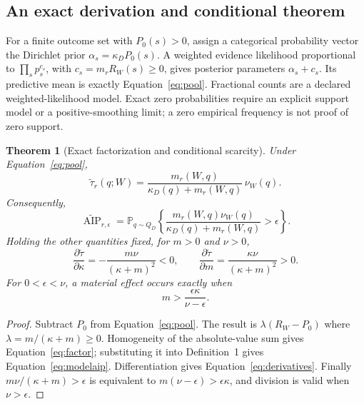 \documentclass[11pt,letterpaper]{article}
\newtheorem{theorem}{Theorem}
\theoremstyle{definition}\newtheorem{definition}[theorem]{Definition}
\newcommand{\AIP}{\operatorname{AIP}}
\newcommand{\Prob}{\mathbb{P}}
\begin{document}
\subsection{An exact derivation and conditional theorem}
For a finite outcome set with $P_0(s)>0$, assign a categorical probability vector the Dirichlet prior $\alpha_s=\kappa_D P_0(s)$. A weighted evidence likelihood proportional to $\prod_s p_s^{c_s}$, with $c_s=m_rR_W(s)\ge0$, gives posterior parameters $\alpha_s+c_s$. Its predictive mean is exactly Equation~\eqref{eq:pool}. Fractional counts are a declared weighted-likelihood model. Exact zero probabilities require an explicit support model or a positive-smoothing limit; a zero empirical frequency is not proof of zero support.

\begin{theorem}[Exact factorization and conditional scarcity]
Under Equation~\eqref{eq:pool},
\begin{equation}
\boxed{\widetilde\tau_r(q;W)
=\frac{m_r(W,q)}{\kappa_D(q)+m_r(W,q)}\,\nu_W(q).}
\label{eq:factor}
\end{equation}
Consequently,
\begin{equation}
\boxed{\widetilde{\AIP}_{r,\epsilon}
=\Prob_{q\sim Q_D}\left\{
\frac{m_r(W,q)\nu_W(q)}{\kappa_D(q)+m_r(W,q)}>\epsilon\right\}.}
\label{eq:modelaip}
\end{equation}
Holding the other quantities fixed, for $m>0$ and $\nu>0$,
\begin{equation}
\frac{\partial\widetilde\tau}{\partial\kappa}
=-\frac{m\nu}{(\kappa+m)^2}<0,
\qquad
\frac{\partial\widetilde\tau}{\partial m}
=\frac{\kappa\nu}{(\kappa+m)^2}>0.
\label{eq:derivatives}
\end{equation}
For $0<\epsilon<\nu$, a material effect occurs exactly when
\begin{equation}
\boxed{m>\frac{\epsilon\kappa}{\nu-\epsilon}.}
\label{eq:threshold}
\end{equation}
\end{theorem}
\begin{proof}
Subtract $P_0$ from Equation~\eqref{eq:pool}. The result is $\lambda(R_W-P_0)$ where $\lambda=m/(\kappa+m)\ge0$. Homogeneity of the absolute-value sum gives Equation~\eqref{eq:factor}; substituting it into Definition~1 gives Equation~\eqref{eq:modelaip}. Differentiation gives Equation~\eqref{eq:derivatives}. Finally $m\nu/(\kappa+m)>\epsilon$ is equivalent to $m(\nu-\epsilon)>\epsilon\kappa$, and division is valid when $\nu>\epsilon$.
\end{proof}
\end{document}
